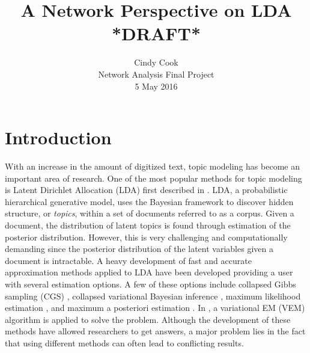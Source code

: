 \documentclass[12pt]{article}
\begin{document}
	\title{A Network Perspective on LDA *DRAFT*}
	\author{Cindy Cook \\ \normalsize Network Analysis Final Project \\ \normalsize 5 May 2016}
	\date{}
	\maketitle

\section{Introduction}

With an increase in the amount of digitized text, topic modeling has become an important area of research. One of the most popular methods for topic modeling is Latent Dirichlet Allocation (LDA) first described in \cite{lda}. LDA, a probabilistic hierarchical generative model, uses the Bayesian framework to discover hidden structure, or \textit{topics},  within a set of documents referred to as a corpus. Given a document, the distribution of latent topics is found through estimation of the posterior distribution. However, this is very challenging and computationally demanding since the posterior distribution of the latent variables given a document is intractable. A heavy development of fast and accurate approximation methods applied to LDA have been developed providing a user with several estimation options. A few of these options include collapsed Gibbs sampling (CGS) \cite{CGS}, collapsed variational Bayesian inference \cite{CVB}, maximum likelihood estimation \cite{ML}, and maximum a posteriori estimation \cite{MAP}. In \cite{lda}, a variational EM (VEM) algorithm is applied to solve the problem. Although the development of these methods have allowed researchers to get answers, a major problem lies in the fact that using different methods can often lead to conflicting results.
\\
\\
\end{document}
